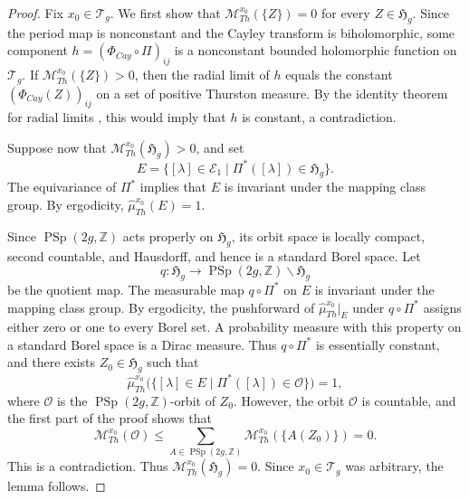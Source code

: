 \documentclass[dvipdfmx]{amsart}
\theoremstyle{remark}
\newcommand{\teich}{\mathcal{T}}
\newcommand{\PThursM}{\hat{\mu}_{Th}}
\newcommand{\PSiegelThursM}{\mathscr{M}_{Th}}
\newcommand{\syp}{\mathop{Sp}}
\newcommand{\psyp}{\mathop{PSp}}
\newcommand{\Cayley}{\Phi_{C\!a\!y}}
\begin{document}
\begin{proof}
Fix $x_0\in\teich_g$.
We first show that $\PSiegelThursM^{x_0}(\{Z\})=0$ for every
$Z\in\mathfrak H_g$.
Since the period map is nonconstant and the Cayley transform is biholomorphic, some component $h=(\Cayley\circ\Pi)_{ij}$ is a nonconstant bounded holomorphic function on $\teich_g$.
If $\PSiegelThursM^{x_0}(\{Z\})>0$, then the radial limit of $h$ equals
the constant $(\Cayley(Z))_{ij}$ on a set of positive
Thurston measure.
By the identity theorem for radial limits
\cite[Theorem 1.2]{Miyachi2024Bounded}, this would imply
that $h$ is constant, a contradiction.

Suppose now that $\PSiegelThursM^{x_0}(\mathfrak H_g)>0$, and set
\[
E=\{[\lambda]\in\mathcal E_1
       \mid \Pi^*([\lambda])\in\mathfrak H_g\}.
\]
The equivariance of $\Pi^*$ implies that $E$ is invariant
under the mapping class group.
By ergodicity, $\PThursM^{x_0}(E)=1$.

Since $\psyp(2g,\mathbb{Z})$ acts properly on $\mathfrak{H}_g$, its orbit space is locally compact, second countable, and Hausdorff, and hence is a standard Borel space.
Let
\[
q\colon\mathfrak{H}_g\longrightarrow
\psyp(2g,\mathbb{Z})\backslash\mathfrak{H}_g
\]
be the quotient map.
The measurable map $q\circ\Pi^*$ on $E$ is invariant
under the mapping class group.
By ergodicity, the pushforward of $\PThursM^{x_0}|_E$ under $q\circ\Pi^*$ assigns either zero or one to every Borel set. A probability measure with this property on a standard Borel space is a Dirac measure. Thus $q\circ\Pi^*$ is essentially constant, and there exists $Z_0\in\mathfrak{H}_g$ such that
\[
\PThursM^{x_0}\bigl(\{[\lambda]\in E
          \mid \Pi^*([\lambda])\in \mathcal{O}\}\bigr)=1,
\]
where $\mathcal{O}$ is the $\psyp(2g,\mathbb{Z})$-orbit of $Z_0$.
However, the orbit $\mathcal{O}$ is countable, and the first part of the proof shows that
\[
\PSiegelThursM^{x_0}(\mathcal{O})
\le
\sum_{A\in\psyp(2g,\mathbb{Z})}\PSiegelThursM^{x_0}(\{A(Z_0)\})
=0.
\]
This is a contradiction.
Thus $\PSiegelThursM^{x_0}(\mathfrak H_g)=0$.
Since $x_0\in \teich_g$ was arbitrary, the lemma follows.
\end{proof}
\end{document}
